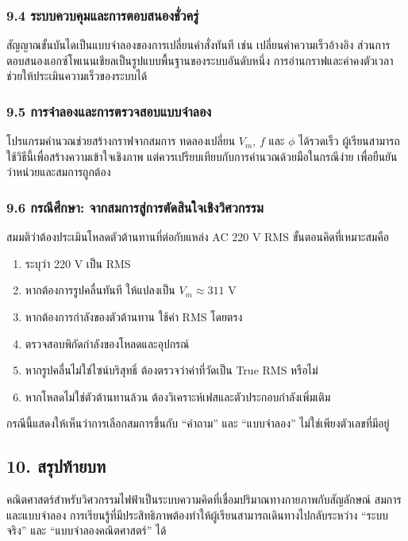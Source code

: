 \subsubsection{9.4 ระบบควบคุมและการตอบสนองชั่วครู่}

สัญญาณขั้นบันไดเป็นแบบจำลองของการเปลี่ยนคำสั่งทันที เช่น เปลี่ยนค่าความเร็วอ้างอิง ส่วนการตอบสนองเอกซ์โพเนนเชียลเป็นรูปแบบพื้นฐานของระบบอันดับหนึ่ง การอ่านกราฟและค่าคงตัวเวลาช่วยให้ประเมินความเร็วของระบบได้

\subsubsection{9.5 การจำลองและการตรวจสอบแบบจำลอง}

โปรแกรมคำนวณช่วยสร้างกราฟจากสมการ ทดลองเปลี่ยน $V_m$, $f$ และ $\phi$ ได้รวดเร็ว ผู้เรียนสามารถใช้วิธีนี้เพื่อสร้างความเข้าใจเชิงภาพ แต่ควรเปรียบเทียบกับการคำนวณด้วยมือในกรณีง่าย เพื่อยืนยันว่าหน่วยและสมการถูกต้อง

\subsubsection{9.6 กรณีศึกษา: จากสมการสู่การตัดสินใจเชิงวิศวกรรม}

สมมติว่าต้องประเมินโหลดตัวต้านทานที่ต่อกับแหล่ง AC 220 V RMS ขั้นตอนคิดที่เหมาะสมคือ

\begin{enumerate}
    \item ระบุว่า 220 V เป็น RMS
    \item หากต้องการรูปคลื่นทันที ให้แปลงเป็น $V_m\approx311$ V
    \item หากต้องการกำลังของตัวต้านทาน ใช้ค่า RMS โดยตรง
    \item ตรวจสอบพิกัดกำลังของโหลดและอุปกรณ์
    \item หากรูปคลื่นไม่ใช่ไซน์บริสุทธิ์ ต้องตรวจว่าค่าที่วัดเป็น True RMS หรือไม่
    \item หากโหลดไม่ใช่ตัวต้านทานล้วน ต้องวิเคราะห์เฟสและตัวประกอบกำลังเพิ่มเติม
\end{enumerate}

กรณีนี้แสดงให้เห็นว่าการเลือกสมการขึ้นกับ “คำถาม” และ “แบบจำลอง” ไม่ใช่เพียงตัวเลขที่มีอยู่

 

\subsection{10. สรุปท้ายบท}

คณิตศาสตร์สำหรับวิศวกรรมไฟฟ้าเป็นระบบความคิดที่เชื่อมปริมาณทางกายภาพกับสัญลักษณ์ สมการ และแบบจำลอง การเรียนรู้ที่มีประสิทธิภาพต้องทำให้ผู้เรียนสามารถเดินทางไปกลับระหว่าง “ระบบจริง” และ “แบบจำลองคณิตศาสตร์” ได้

